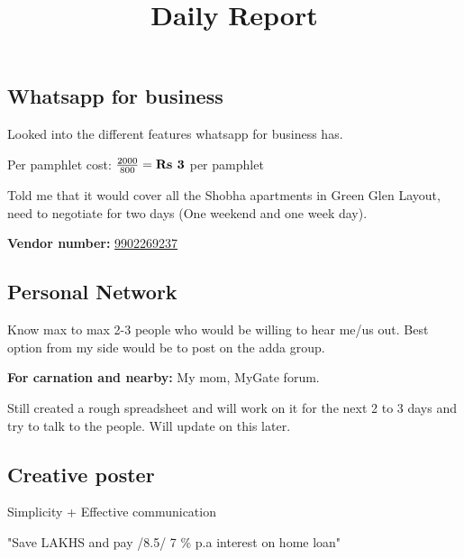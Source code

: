 \documentclass[12pt, a4paper]{article}
\begin{document}
\title{Daily Report}
\maketitle

\subsection{Whatsapp for business}

Looked into the different features whatsapp for business has.



\vspace{0.5cm}

Per pamphlet cost: $\frac{2000}{800} = \textbf{Rs \the\numexpr 2000 / 800 \relax} $ per pamphlet

\bigskip

\noindent Told me that it would cover all the Shobha apartments in Green Glen Layout, need to negotiate for two days (One weekend and one week day).

\bigskip

\textbf{Vendor number:} \href{tel:+919902269237}{9902269237}

\subsection{Personal Network}

Know max to max 2-3 people who would be willing to hear me/us out. Best option from my side would be to post on the adda group.

\vspace{0.25cm}

\noindent \textbf{For carnation and nearby:} My mom, MyGate forum.

\vspace{0.25cm}

\noindent Still created a rough spreadsheet and will work on it for the next 2 to 3 days and try to talk to the people. Will update on this later.

\subsection{Creative poster}

Simplicity + Effective communication

\vspace{0.3cm}

"Save LAKHS and pay /8.5/ 7 \% p.a interest on home loan"
\end{document}
